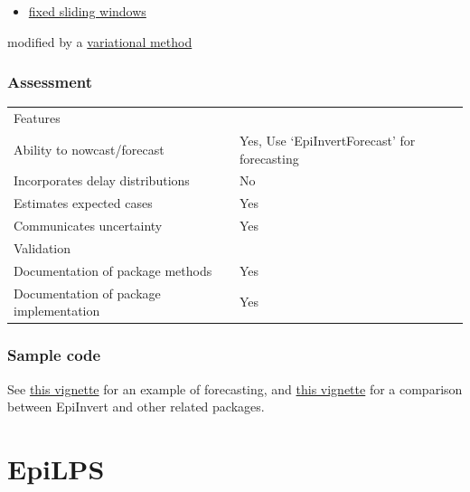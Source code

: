 \documentclass[
  letterpaper,
  DIV=11,
  numbers=noendperiod]{scrreprt}
\providecommand{\tightlist}{%
  \setlength{\itemsep}{0pt}\setlength{\parskip}{0pt}}\usepackage{longtable,booktabs,array}
\begin{document}
\begin{itemize}
\tightlist
\item
  \hyperref[sec-fixedwindow]{fixed sliding windows}
\end{itemize}

modified by a \hyperref[sec-var]{variational method}

\subsection*{Assessment}\label{assessment-6}

\begin{longtable}[]{@{}
  >{\raggedright\arraybackslash}p{}
  >{\raggedright\arraybackslash}p{}@{}}
\toprule\noalign{}
\endhead
\bottomrule\noalign{}
\endlastfoot
Features & \\
Ability to nowcast/forecast & Yes, Use `EpiInvertForecast' for
forecasting \\
Incorporates delay distributions & No \\
Estimates expected cases & Yes \\
Communicates uncertainty & Yes \\
Validation & \\
Documentation of package methods & Yes \\
Documentation of package implementation & Yes \\
\end{longtable}

\subsection*{Sample code}\label{sample-code-6}

See
\href{https://lalvarezmat.github.io/EpiInvert/EpiInvertForecastVignette.html}{this
vignette} for an example of forecasting, and
\href{https://lalvarezmat.github.io/EpiInvert/RtComparisonVignette.html}{this
vignette} for a comparison between EpiInvert and other related packages.

\chapter*{EpiLPS}\label{epilps}

\end{document}
